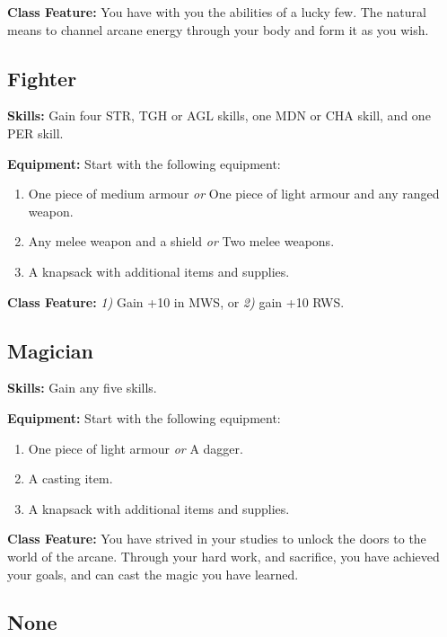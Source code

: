 \documentclass[12pt,]{article}
\providecommand{\tightlist}{%
  \setlength{\itemsep}{0pt}\setlength{\parskip}{0pt}}
\begin{document}
\textbf{Class Feature:} You have with you the abilities of a lucky few.
The natural means to channel arcane energy through your body and form it
as you wish.

\subsection{Fighter}\label{fighter}

\textbf{Skills:} Gain four STR, TGH or AGL skills, one MDN or CHA skill,
and one PER skill.

\textbf{Equipment:} Start with the following equipment:

\begin{enumerate}
\def\labelenumi{\arabic{enumi}.}
\tightlist
\item
  One piece of medium armour \emph{or} One piece of light armour and any
  ranged weapon.
\item
  Any melee weapon and a shield \emph{or} Two melee weapons.
\item
  A knapsack with additional items and supplies.
\end{enumerate}

\textbf{Class Feature:} \emph{1)} Gain +10 in MWS, or \emph{2)} gain +10
RWS.

\subsection{Magician}\label{magician}

\textbf{Skills:} Gain any five skills.

\textbf{Equipment:} Start with the following equipment:

\begin{enumerate}
\def\labelenumi{\arabic{enumi}.}
\tightlist
\item
  One piece of light armour \emph{or} A dagger.
\item
  A casting item.
\item
  A knapsack with additional items and supplies.
\end{enumerate}

\textbf{Class Feature:} You have strived in your studies to unlock the
doors to the world of the arcane. Through your hard work, and sacrifice,
you have achieved your goals, and can cast the magic you have learned.

\subsection{None}\label{none}
\end{document}
